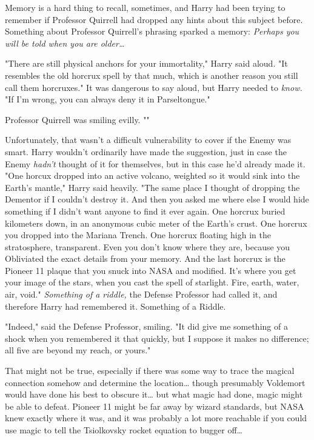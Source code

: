Memory is a hard thing to recall, sometimes, and Harry had been trying to 
remember if Professor Quirrell had dropped any hints about this subject before. 
Something about Professor Quirrell's phrasing sparked a memory: \emph{Perhaps 
you will be told when you are older{\ldots}}

"There are still physical anchors for your immortality," Harry said aloud. "It 
resembles the old horcrux spell by that much, which is another reason you still 
call them horcruxes." It was dangerous to say aloud, but Harry needed to 
\emph{know.} "If I'm wrong, you can always deny it in Parseltongue."

Professor Quirrell was smiling evilly. ""

Unfortunately, that wasn't a difficult vulnerability to cover if the Enemy was 
smart. Harry wouldn't ordinarily have made the suggestion, just in case the 
Enemy \emph{hadn't} thought of it for themselves, but in this case he'd already 
made it. "One horcux dropped into an active volcano, weighted so it would sink 
into the Earth's mantle," Harry said heavily. "The same place I thought of 
dropping the Dementor if I couldn't destroy it. And then you asked me where 
else I would hide something if I didn't want anyone to find it ever again. One 
horcrux buried kilometers down, in an anonymous cubic meter of the Earth's 
crust. One horcrux you dropped into the Mariana Trench. One horcrux floating 
high in the stratosphere, transparent. Even you don't know where they are, 
because you Obliviated the exact details from your memory. And the last horcrux 
is the Pioneer 11 plaque that you snuck into NASA and modified. It's where you 
get your image of the stars, when you cast the spell of starlight. Fire, earth, 
water, air, void." \emph{Something of a riddle,} the Defense Professor had 
called it, and therefore Harry had remembered it. Something of a Riddle.

"Indeed," said the Defense Professor, smiling. "It did give me something of a 
shock when you remembered it that quickly, but I suppose it makes no 
difference; all five are beyond my reach, or yours."

That might not be true, especially if there was some way to trace the magical 
connection somehow and determine the location{\ldots} though presumably 
Voldemort would have done his best to obscure it{\ldots} but what magic had 
done, magic might be able to defeat. Pioneer 11 might be far away by wizard 
standards, but NASA knew exactly where it was, and it was probably a lot more 
reachable if you could use magic to tell the Tsiolkovsky rocket equation to 
bugger off{\ldots}

